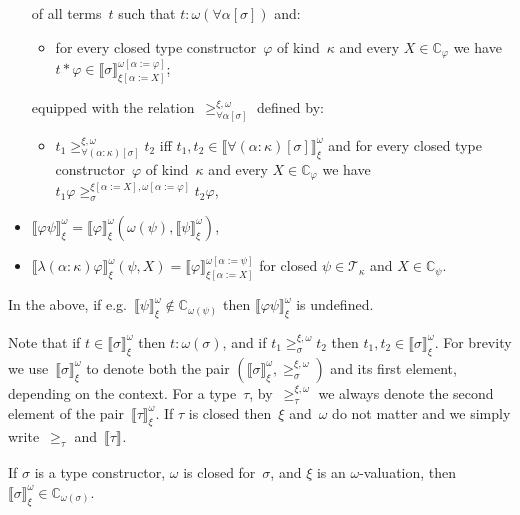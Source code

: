 \documentclass[runningheads,a4paper]{llncs}
\newcommand{\tapp}[2]{#1 * #2}
\newcommand{\subst}[2]{#1:=#2}
\newcommand{\Tc}{\mathcal{T}}
\newcommand{\Cb}{\mathbb{C}}
\newcommand{\val}[3]{\ensuremath{\llbracket#1\rrbracket_{#2}^{#3}}}
\newcommand{\gteq}[3]{\ensuremath{\ge_{#1}^{#2,#3}}}
\begin{document}
\begin{definition}
\begin{itemize}
    of all terms~$t$ such that $t : \omega(\forall\alpha[\sigma])$ and:
    \begin{itemize}
    \item for every closed type constructor~$\varphi$ of kind~$\kappa$
      and every $X \in \Cb_\varphi$ we have $\tapp{t}{\varphi} \in
      \val{\sigma}{\xi[\subst{\alpha}{X}]}{\omega[\subst{\alpha}{\varphi}]}$;
    \end{itemize}
    equipped with the
    relation~$\gteq{\forall\alpha[\sigma]}{\xi}{\omega}$ defined by:
    \begin{itemize}
    \item $t_1 \gteq{\forall(\alpha:\kappa)[\sigma]}{\xi}{\omega} t_2$
      iff $t_1,t_2 \in
      \val{\forall(\alpha:\kappa)[\sigma]}{\xi}{\omega}$ and for every
      closed type constructor~$\varphi$ of kind~$\kappa$ and every $X
      \in \Cb_\varphi$ we have $t_1 \varphi
      \gteq{\sigma}{\xi[\subst{\alpha}{X}]}{\omega[\subst{\alpha}{\varphi}]}
      t_2 \varphi$,
    \end{itemize}
  \item
    $\val{\varphi \psi}{\xi}{\omega} =
    \val{\varphi}{\xi}{\omega}(\omega(\psi),\val{\psi}{\xi}{\omega})$,
  \item
    $\val{\lambda(\alpha:\kappa)\varphi}{\xi}{\omega}(\psi,X) =
    \val{\varphi}{\xi[\subst{\alpha}{X}]}{\omega[\subst{\alpha}{\psi}]}$
    for closed $\psi \in \Tc_\kappa$ and $X \in \Cb_\psi$.
  \end{itemize}
  In the above, if e.g.~$\val{\psi}{\xi}{\omega} \notin
  \Cb_{\omega(\psi)}$ then $\val{\varphi \psi}{\xi}{\omega}$ is
  undefined.
\end{definition}

Note that if $t \in \val{\sigma}{\xi}{\omega}$ then $t :
\omega(\sigma)$, and if $t_1 \gteq{\sigma}{\xi}{\omega} t_2$ then
$t_1,t_2\in\val{\sigma}{\xi}{\omega}$. For brevity we
use~$\val{\sigma}{\xi}{\omega}$ to denote both the pair
$(\val{\sigma}{\xi}{\omega},{\gteq{\sigma}{\xi}{\omega}})$ and its
first element, depending on the context. For a type~$\tau$,
by~$\gteq{\tau}{\xi}{\omega}$ we always denote the second element of
the pair~$\val{\tau}{\xi}{\omega}$. If $\tau$ is closed then~$\xi$
and~$\omega$ do not matter and we simply write~$\geq_\tau$
and~$\val{\tau}{}{}$.

\begin{lemma}\label{lem_val_wm_computable}
  If $\sigma$ is a type constructor, $\omega$ is closed for~$\sigma$,
  and $\xi$ is an $\omega$-valuation, then $\val{\sigma}{\xi}{\omega}
  \in \Cb_{\omega(\sigma)}$.
\end{lemma}
\end{document}
